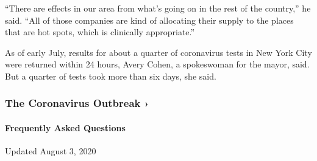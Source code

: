 ``There are effects in our area from what's going on in the rest of the
country,'' he said. ``All of those companies are kind of allocating
their supply to the places that are hot spots, which is clinically
appropriate.''

As of early July, results for about a quarter of coronavirus tests in
New York City were returned within 24 hours, Avery Cohen, a spokeswoman
for the mayor, said. But a quarter of tests took more than six days, she
said.

\href{https://www.nytimes.com/news-event/coronavirus?action=click\&pgtype=Article\&state=default\&region=MAIN_CONTENT_3\&context=storylines_faq}{}

\hypertarget{the-coronavirus-outbreak-}{%
\subsubsection{The Coronavirus Outbreak
›}\label{the-coronavirus-outbreak-}}

\hypertarget{frequently-asked-questions}{%
\paragraph{Frequently Asked
Questions}\label{frequently-asked-questions}}

Updated August 3, 2020

